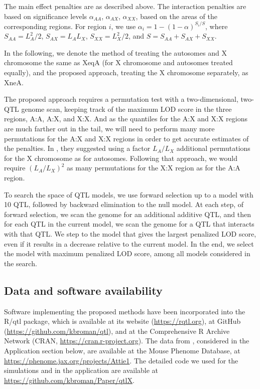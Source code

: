 \documentclass[12pt,letterpaper]{article}
\begin{document}
The main effect penalties are as described above. The interaction
penalties are based on significance levels $\alpha_{AA}$,
$\alpha_{AX}$, $\alpha_{XX}$, based on the areas of the corresponding
regions. For region $i$, we use $\alpha_i = 1 - (1-\alpha)^{S_i/S}$,
where $S_{AA} = L_A^2/2$, $S_{AX} = L_AL_X$, $S_{XX} = L_X^2/2$, and
$S = S_{AA} + S_{AX} + S_{XX}$.

In the following, we denote the method of \citet{Manichaikul2009}
treating the autosomes and X chromosome the same as XeqA (for X
chromosome and autosomes treated equally), and the proposed approach,
treating the X chromosome separately, as XneA.

The proposed approach requires a permutation test with a
two-dimensional, two-QTL genome scan, keeping track of the maximum LOD
score in the three regions, A:A, A:X, and X:X. And as the quantiles
for the A:X and X:X regions are much farther out in the tail, we will
need to perform many more permutations for the A:X and X:X regions in
order to get accurate estimates of the penalties. In
\citet{Broman2006}, they suggested using a factor $L_A/L_X$ additional
permutations for the X chromosome as for autosomes. Following that
approach, we would require $(L_A/L_X)^2$ as many permutations for the
X:X region as for the A:A region.

To search the space of QTL models, we use forward selection up to a
model with 10 QTL, followed by backward elimination to
the null model. At each step, of forward selection, we scan the genome
for an additional additive QTL, and then for each QTL in the current
model, we scan the genome for a QTL that interacts with that QTL. We
step to the model that gives the largest penalized LOD score, even if
it results in a decrease relative to the current model. In the end, we
select the model with maximum penalized LOD score, among all models
considered in the search.

\subsection*{Data and software availability}

Software implementing the proposed methods have been incorporated into
the R/qtl package, which is available at its website
(\url{https://rqtl.org}), at GitHub
(\url{https://github.com/kbroman/qtl}), and at the Comprehensive R
Archive Network (CRAN, \url{https://cran.r-project.org}).
The data from \citet{Tian2016}, considered in the Application section
below, are available at
the Mouse Phenome Database, at
\url{https://phenome.jax.org/projects/Attie1}.
The detailed code we used for the simulations and in the application
are available at \url{https://github.com/kbroman/Paper/qtlX}.
\end{document}
